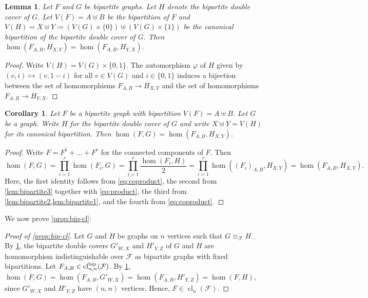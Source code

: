 \documentclass[11pt, DIV=15]{scrarticle}
\theoremstyle{definition}
\theoremstyle{plain}
\newtheorem{lemma}[definition]{Lemma}
\newtheorem{corollary}[definition]{Corollary}
\theoremstyle{remark}
\DeclareMathOperator{\cl}{cl}
\renewcommand{\phi}{\varphi}
\begin{document}
	
	\begin{lemma}\label{lem:bipartite2}
		Let $F$ and $G$ be bipartite graphs.
		Let $H$ denote the bipartite double cover of $G$.
		Let $V(F) = A \uplus B$ be the bipartition of $F$ and $V(H) = X \uplus Y \coloneqq (V(G) \times \{0\}) \uplus (V(G) \times \{1\})$ be the canonical bipartition of the bipartite double cover of $G$.
		Then
		$
		\hom(F_{A, B}, H_{X, Y})
		= \hom(F_{A, B}, H_{Y, X}).
		$
	\end{lemma}
	\begin{proof}
		Write $V(H) = V(G) \times \{0,1\}$. 
		The automorphism $\phi$ of $H$ given by $(v, i) \mapsto (v, 1-i)$ for all $v \in V(G)$ and $i \in \{0,1\}$ induces a bijection between the set of homomorphisms $F_{A, B}  \to H_{X, Y}$ and the set of homomorphisms $F_{A, B} \to H_{Y, X}$.
	\end{proof}
	
	\begin{corollary}\label{lem:double-cover-combined}
		Let $F$ be a bipartite graph with bipartition $V(F) = A \uplus B$.
		Let $G$ be a graph.
		Write $H$ for the bipartite double cover of $G$  
		and write $X \uplus Y = V(H)$ for its canonical bipartition.
		Then $\hom(F, G) = \hom(F_{A,B}, H_{X,Y})$.
	\end{corollary}
	\begin{proof}
		Write $F = F^1 + \dots+ F^r$ for the connected components of $F$.
		Then
		\[
			\hom(F, G)
			= \prod_{i =1}^r \hom(F_i, G)
			=  \prod_{i =1}^r \frac{\hom(F_i, H)}{2}
			= \prod_{i =1}^r  \hom((F_i)_{A, B}, H_{X, Y})
			= \hom(F_{A,B}, H_{X,Y}).
		\]
		Here, the first identity follows from \cref{eq:coproduct},
		the second from \cref{lem:bipartite3} together with \cref{eq:product},
		the third from \cref{lem:bipartite2,lem:bipartite1},
		and the fourth from \cref{eq:coproduct}.
	\end{proof}
	
	We now prove \cref{prop:bip-cl}:
	\begin{proof}[Proof of \cref{prop:bip-cl}]
		Let $G$ and $H$ be graphs on $n$ vertices
		such that $G \equiv_{\mathcal{F}} H$.
		By \cref{lem:double-cover-combined},
		the bipartite double covers $G'_{W, X}$ and $H'_{Y, Z}$ of $G$ and $H$
		are homomorphism indistinguishable over $\mathcal{F}$
		as bipartite graphs with fixed bipartitions.
		Let $F_{A,B} \in \cl_{n,n}^{\textup{bip}}(\mathcal{F})$.
		By \cref{lem:double-cover-combined}, 
		$\hom(F, G) = \hom(F_{A,B}, G'_{W, X}) = \hom(F_{A,B}, H'_{Y, Z}) = \hom(F, H)$,
		since $G'_{W,X}$ and $H'_{Y,Z}$ have $(n,n)$ vertices.
		Hence, $F \in \cl_n(\mathcal{F})$.
	\end{proof}
	
\end{document}
